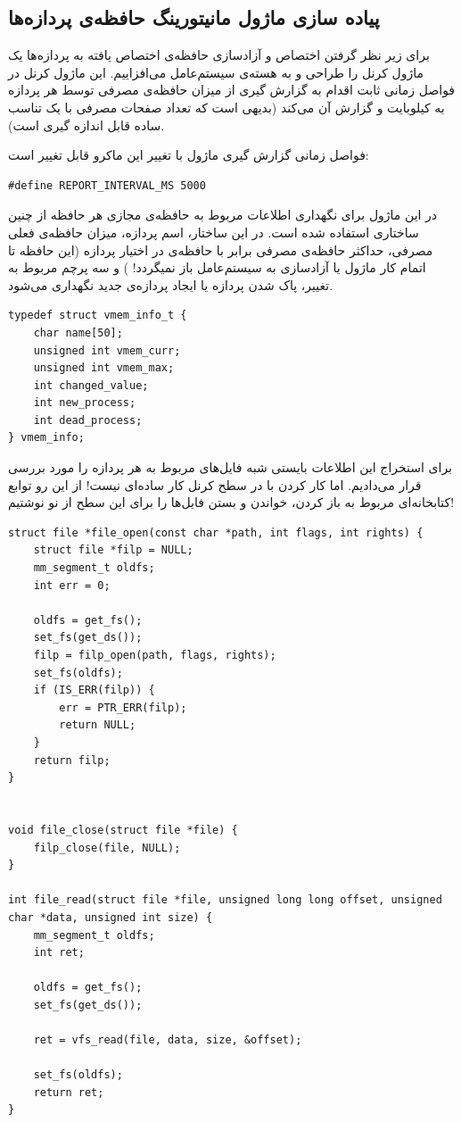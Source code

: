 \documentclass{article}
\begin{document}
\subsection{پیاده سازی ماژول مانیتورینگ حافظه‌ی پردازه‌ها}
برای  زیر نظر گرفتن اختصاص و آزادسازی حافظه‌ی اختصاص یافته به پردازه‌ها یک ماژول کرنل را طراحی و به هسته‌ی سیستم‌عامل می‌افزاییم. این ماژول کرنل در فواصل زمانی ثابت \cite{10} اقدام به گزارش گیری از میزان حافظه‌ی مصرفی توسط هر پردازه به کیلوبایت و گزارش آن می‌کند (بدیهی است که تعداد صفحات مصرفی با یک تناسب ساده قابل اندازه گیری است).

فواصل زمانی گزارش گیری ماژول با تغییر این ماکرو قابل تغییر است:
 
\begin{latin}
\begin{verbatim}
#define REPORT_INTERVAL_MS 5000
\end{verbatim}
\end{latin}

در این ماژول برای نگهداری اطلاعات مربوط به حافظه‌ی مجازی هر حافظه از چنین ساختاری استفاده شده است. در این ساختار، اسم پردازه، میزان حافظه‌ی فعلی مصرفی، حداکثر حافظه‌ی مصرفی برابر با حافظه‌ی در اختیار پردازه (این حافظه تا اتمام کار ماژول یا آزادسازی به سیستم‌عامل باز نمیگردد! ) و سه پرچم مربوط به تغییر، پاک شدن پردازه یا ایجاد پردازه‌ی جدید نگهداری می‌شود.

\begin{latin}
\begin{verbatim}
typedef struct vmem_info_t {
    char name[50];
    unsigned int vmem_curr;
    unsigned int vmem_max;
    int changed_value;
    int new_process;
    int dead_process;
} vmem_info;
\end{verbatim}	
\end{latin}

برای استخراج این اطلاعات بایستی شبه فایل‌های 
مربوط  به هر پردازه را مورد بررسی قرار می‌دادیم. اما کار کردن با  در سطح کرنل کار ساده‌ای نیست! از این رو توابع کتابخانه‌ای مربوط به باز کردن، خواندن و بستن فایل‌ها را  برای این سطح از نو نوشتیم!
\cite{9}
\begin{latin}
\begin{verbatim}
struct file *file_open(const char *path, int flags, int rights) {
    struct file *filp = NULL;
    mm_segment_t oldfs;
    int err = 0;

    oldfs = get_fs();
    set_fs(get_ds());
    filp = filp_open(path, flags, rights);
    set_fs(oldfs);
    if (IS_ERR(filp)) {
        err = PTR_ERR(filp);
        return NULL;
    }
    return filp;
}


void file_close(struct file *file) {
    filp_close(file, NULL);
}

int file_read(struct file *file, unsigned long long offset, unsigned char *data, unsigned int size) {
    mm_segment_t oldfs;
    int ret;

    oldfs = get_fs();
    set_fs(get_ds());

    ret = vfs_read(file, data, size, &offset);

    set_fs(oldfs);
    return ret;
}
\end{verbatim}
\end{latin}
\end{document}
